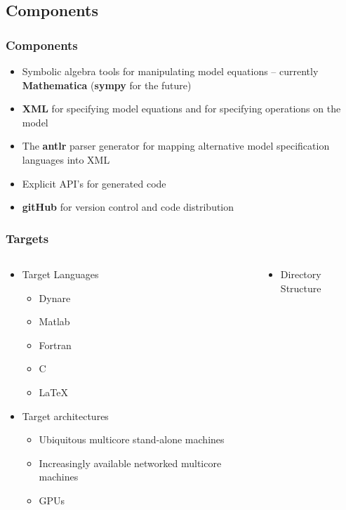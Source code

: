 \documentclass[tikz]{beamer}
\newcommand{\mma}{Mathematica}
\begin{document}
\subsection{Components}
\begin{frame}
  \frametitle{Components}  

{\small
  \begin{itemize}
\item Symbolic algebra tools for manipulating model equations
 -- currently {\bf \mma}  ({\bf sympy} for the future)
\item {\bf XML} for specifying model equations and 
for specifying operations on the model
\item The {\bf antlr} parser generator for mapping alternative 
model specification languages into  XML
\item Explicit  API's for generated code
\item {\bf gitHub} for version control and code distribution
  \end{itemize}

}
\end{frame}



\begin{frame}
  \frametitle{Targets}
  \begin{columns}
    \begin{column}{.5\linewidth}
      

  \begin{itemize}
\item Target Languages
    \begin{itemize}
    \item Dynare
    \item Matlab
    \item Fortran
    \item C
    \item \LaTeX
    \end{itemize}
\item Target architectures
  \begin{itemize}
\item Ubiquitous multicore stand-alone machines
  \item Increasingly available networked multicore machines
  \item GPUs
  \end{itemize}


  \end{itemize}
\end{column}
    \begin{column}{.5\linewidth}

      \begin{itemize}
      \item Directory Structure
      \end{itemize}





\end{column}

  \end{columns}


\end{frame}
\end{document}
